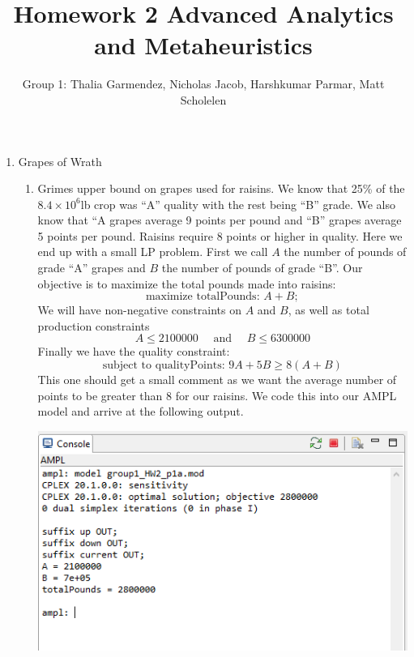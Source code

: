 \documentclass[11pt]{article}
\author{Group 1:  Thalia Garmendez, Nicholas Jacob, Harshkumar Parmar, Matt Scholelen}
\title{Homework 2 Advanced Analytics and Metaheuristics}
\begin{document}
\maketitle
%
\begin{enumerate}
\item Grapes of Wrath
\begin{enumerate}
\item Grimes upper bound on grapes used for raisins.  We know that 25\% of the $8.4\times10^6$lb crop was ``A'' quality with the rest being ``B'' grade.  We also know that ``A grapes average 9 points per pound and ``B'' grapes average 5 points per pound.  Raisins require 8 points or higher in quality.  Here we end up with a small LP problem.  First we call $A$ the number of pounds of grade ``A'' grapes and $B$ the number of pounds of grade ``B''.  Our objective is to maximize the total pounds made into raisins:
\[
\text{maximize totalPounds: }A +B;
\]
We will have non-negative constraints on $A$ and $B$, as well as total production constraints
\[
A\leq 2 100 000\quad\text{ and }\quad B\leq 6 300 000
\]
Finally we have the quality constraint:
\[
\text{subject to qualityPoints: }9A +5B \geq 8\left(A+B\right)
\]
This one should get a small comment as we want the average number of points to be greater than 8 for our raisins.  We code this into our AMPL model and arrive at the following output.


\includegraphics[width = .9\textwidth]{outputp1a.png}


\end{enumerate}
\end{enumerate}
\end{document}
